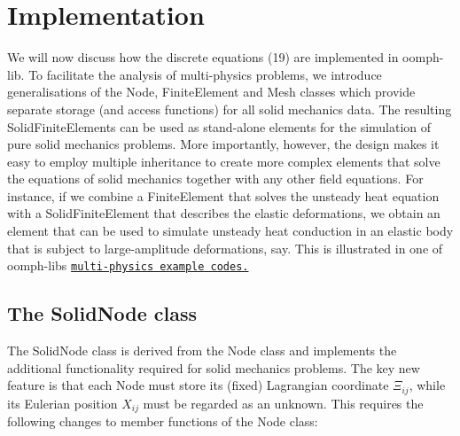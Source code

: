 \hypertarget{index_solid_implementation}{}\section{Implementation}\label{index_solid_implementation}
We will now discuss how the discrete equations (19) are implemented in {\ttfamily oomph-\/lib}. To facilitate the analysis of multi-\/physics problems, we introduce generalisations of the {\ttfamily Node}, {\ttfamily Finite\+Element} and {\ttfamily Mesh} classes which provide separate storage (and access functions) for all solid mechanics data. The resulting {\ttfamily Solid\+Finite\+Elements} can be used as stand-\/alone elements for the simulation of pure solid mechanics problems. More importantly, however, the design makes it easy to employ multiple inheritance to create more complex elements that solve the equations of solid mechanics together with any other field equations. For instance, if we combine a {\ttfamily Finite\+Element} that solves the unsteady heat equation with a {\ttfamily Solid\+Finite\+Element} that describes the elastic deformations, we obtain an element that can be used to simulate unsteady heat conduction in an elastic body that is subject to large-\/amplitude deformations, say. This is illustrated in one of {\ttfamily oomph-\/lib\textquotesingle{}s} \href{../../../multi_physics/thermo/html/index.html}{\tt multi-\/physics example codes.}



\hypertarget{index_solid_node}{}\subsection{The Solid\+Node class}\label{index_solid_node}
The {\ttfamily Solid\+Node} class is derived from the {\ttfamily Node} class and implements the additional functionality required for solid mechanics problems. The key new feature is that each {\ttfamily Node} must store its (fixed) Lagrangian coordinate $ \Xi_{ij}$, while its Eulerian position $ X_{ij}$ must be regarded as an unknown. This requires the following changes to member functions of the {\ttfamily Node} class\+:


